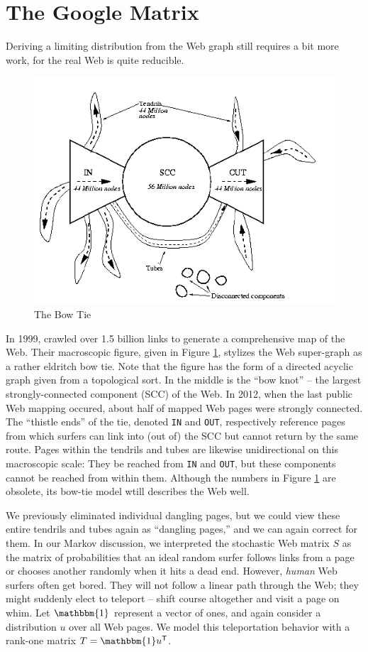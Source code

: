 \documentclass[12pt]{article}
\newcommand{\transpose}[1]{#1^{\mathsf{T}}}
\begin{document}
\section{The Google Matrix}
Deriving a limiting distribution from the Web graph still requires a bit more
work, for the real Web is quite reducible.
\begin{figure}
  \centering
  \includegraphics[scale=0.6]{bow-tie}
  \caption{The Bow Tie \cite{broderGraphStructureWeb}}
  \label{fig:bow-tie}
\end{figure}
In 1999, \cite{broderGraphStructureWeb} crawled over 1.5 billion links to
generate a comprehensive map of the Web. Their macroscopic figure, given in
Figure \ref{fig:bow-tie}, stylizes the Web super-graph as a rather eldritch bow
tie. Note that the figure has the form of a directed acyclic graph given from a
topological sort. In the middle is the ``bow knot'' -- the largest
strongly-connected component (SCC) of the Web. In 2012, when the last public Web
mapping occured, about half of mapped Web pages were strongly connected. The
``thistle ends'' of the tie, denoted \texttt{IN} and \texttt{OUT}, respectively
reference pages from which surfers can link into (out of) the SCC but cannot
return by the same route. Pages within the tendrils and tubes are likewise
unidirectional on this macroscopic scale: They be reached from \texttt{IN} and
\texttt{OUT}, but these components cannot be reached from within them. Although
the numbers in Figure \ref{fig:bow-tie} are obsolete, its bow-tie model wtill
describes the Web well.

We previously eliminated individual dangling pages, but we could view these
entire tendrils and tubes again as ``dangling pages,'' and we can again correct
for them. In our Markov discussion, we interpreted the stochastic Web matrix $S$
as the matrix of probabilities that an ideal random surfer follows links from a
page or chooses another randomly when it hits a dead end. However,
\textit{human} Web surfers often get bored. They will not follow a linear path
through the Web; they might suddenly elect to teleport -- shift course
altogether and visit a page on whim. Let $\mathbbm{1}$ represent a vector of
ones, and again consider a distribution $u$ over all Web pages. We model this
teleportation behavior with a rank-one matrix $T = \mathbbm{1}\transpose{u}$.
\end{document}

